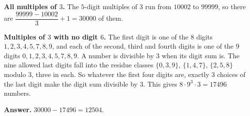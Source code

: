 \textbf{All multiples of $3$.} The $5$-digit multiples of $3$ run from $10002$ to $99999$, so there are $\dfrac{99999-10002}{3}+1=30000$ of them.

\textbf{Multiples of $3$ with no digit $6$.} The first digit is one of the $8$ digits $1,2,3,4,5,7,8,9$, and each of the second, third and fourth digits is one of the $9$ digits $0,1,2,3,4,5,7,8,9$. A number is divisible by $3$ when its digit sum is. The nine allowed last digits fall into the residue classes $\{0,3,9\}$, $\{1,4,7\}$, $\{2,5,8\}$ modulo $3$, three in each. So whatever the first four digits are, exactly $3$ choices of the last digit make the digit sum divisible by $3$. This gives $8\cdot9^3\cdot3=17496$ numbers.

\textbf{Answer.} $30000-17496=\boxed{12504}$.
